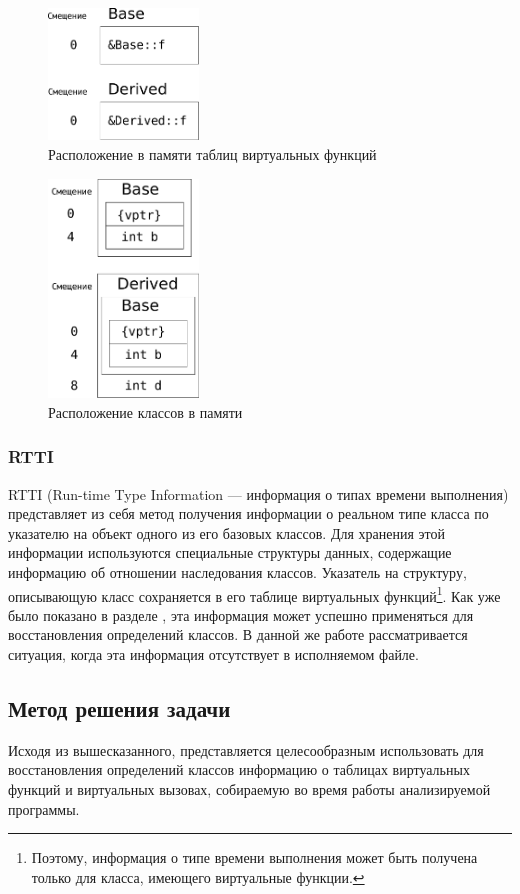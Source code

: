 \documentclass[a4paper,12pt,russian]{article}
\begin{document}
\begin{figure}
  \center
  \includegraphics[width=4cm]{simple_vtables.pdf}
  \hfill
  \caption{Расположение в памяти таблиц виртуальных функций}
  \label{simple_vtables_fig}
\end{figure}

\begin{figure}
  \center
  \includegraphics[width=4cm]{simple_mem_layout.pdf}
  \hfill
  \caption{Расположение классов в памяти}
  \label{memlayout_fig}
\end{figure}

\subsubsection{RTTI}
RTTI (Run-time Type Information --- информация о типах времени выполнения) представляет из себя метод получения информации о реальном типе класса по указателю на объект одного из его базовых классов.
Для хранения этой информации используются специальные структуры данных, содержащие информацию об отношении наследования классов.
Указатель на структуру, описывающую класс сохраняется в его таблице виртуальных функций\footnote{Поэтому, информация о типе времени выполнения может быть получена только для класса, имеющего виртуальные функции.}.
Как уже было показано в разделе \cite{reverse_eng_overview}, эта информация может успешно применяться для восстановления определений классов.
В данной же работе рассматривается ситуация, когда эта информация отсутствует в исполняемом файле.

\subsection{Метод решения задачи}
Исходя из вышесказанного, представляется целесообразным использовать для восстановления определений классов информацию о таблицах виртуальных функций и виртуальных вызовах, собираемую во время работы анализируемой программы.
\end{document}

